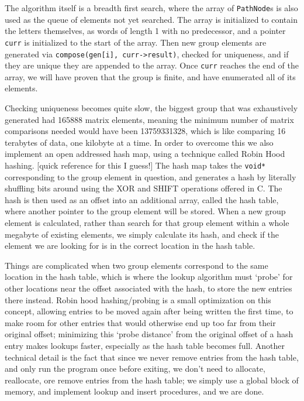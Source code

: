 The algorithm itself is a breadth first search, where the array of \verb`PathNode`s is also used as the queue of elements not yet searched. The array is initialized to contain the letters themselves, as words of length 1 with no predecessor, and a pointer \verb`curr` is initialized to the start of the array. Then new group elements are generated via \verb`compose(gen[i], curr->result)`, checked for uniqueness, and if they are unique they are appended to the array. Once \verb`curr` reaches the end of the array, we will have proven that the group is finite, and have enumerated all of its elements.

Checking uniqueness becomes quite slow, the biggest group that was exhaustively generated had 165888 matrix elements, meaning the minimum number of matrix comparisons needed would have been 13759331328, which is like comparing 16 terabytes of data, one kilobyte at a time. In order to overcome this we also implement an open addressed hash map, using a technique called Robin Hood hashing. [quick reference for this I guess!] The hash map takes the \verb`void*` corresponding to the group element in question, and generates a hash by literally shuffling bits around using the XOR and SHIFT operations offered in C. The hash is then used as an offset into an additional array, called the hash table, where another pointer to the group element will be stored. When a new group element is calculated, rather than search for that group element within a whole megabyte of existing elements, we simply calculate its hash, and check if the element we are looking for is in the correct location in the hash table.

Things are complicated when two group elements correspond to the same location in the hash table, which is where the lookup algorithm must `probe' for other locations near the offset associated with the hash, to store the new entries there instead. Robin hood hashing/probing is a small optimization on this concept, allowing entries to be moved again after being written the first time, to make room for other entries that would otherwise end up too far from their original offset; minimizing this `probe distance' from the original offset of a hash entry makes lookups faster, especially as the hash table becomes full. Another technical detail is the fact that since we never remove entries from the hash table, and only run the program once before exiting, we don't need to allocate, reallocate, ore remove entries from the hash table; we simply use a global block of memory, and implement lookup and insert procedures, and we are done.


